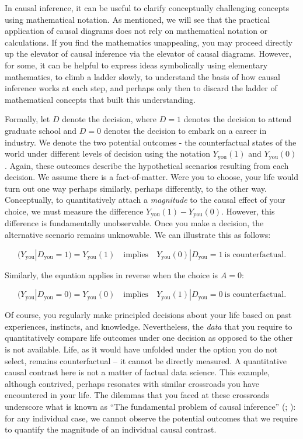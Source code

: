 \documentclass[
  singlecolumn]{article}
\begin{document}
In causal inference, it can be useful to clarify conceptually
challenging concepts using mathematical notation. As mentioned, we will
see that the practical application of causal diagrams does not rely on
mathematical notation or calculations. If you find the mathematics
unappealing, you may proceed directly up the elevator of causal
inference via the elevator of causal diagrams. However, for some, it can
be helpful to express ideas symbolically using elementary mathematics,
to climb a ladder slowly, to understand the basis of how causal
inference works at each step, and perhaps only then to discard the
ladder of mathematical concepts that built this understanding.

Formally, let \(D\) denote the decision, where \(D = 1\) denotes the
decision to attend graduate school and \(D=0\) denotes the decision to
embark on a career in industry. We denote the two potential outcomes -
the counterfactual states of the world under different levels of
decision using the notation \(Y_{\text{you}}(1)\) and
\(Y_{\text{you}}(0)\). Again, these outcomes describe the hypothetical
scenarios resulting from each decision. We assume there is a
fact-of-matter. Were you to choose, your life would turn out one way
perhaps similarly, perhaps differently, to the other way. Conceptually,
to quantitatively attach a \emph{magnitude} to the causal effect of your
choice, we must measure the difference
\(Y_{\text{you}}(1) - Y_{\text{you}}(0)\). However, this difference is
fundamentally unobservable. Once you make a decision, the alternative
scenario remains unknowable. We can illustrate this as follows:

\[
(Y_{\text{you}}|D_{\text{you}} = 1) = Y_{\text{you}}(1) \quad \text{implies} \quad Y_{\text{you}}(0)|D_{\text{you}} = 1~ \text{is counterfactual}.
\]

Similarly, the equation applies in reverse when the choice is \(A = 0\):

\[
(Y_{\text{you}}|D_{\text{you}} = 0) = Y_{\text{you}}(0) \quad \text{implies} \quad Y_{\text{you}}(1)|D_{\text{you}} = 0~ \text{is counterfactual}.
\]

Of course, you regularly make principled decisions about your life based
on past experiences, instincts, and knowledge. Nevertheless, the
\emph{data} that you require to quantitatively compare life outcomes
under one decision as opposed to the other is not available. Life, as it
would have unfolded under the option you do not select, remains
counterfactual -- it cannot be directly measured. A quantitative causal
contrast here is not a matter of factual data science. This example,
although contrived, perhaps resonates with similar crossroads you have
encountered in your life. The dilemmas that you faced at these
crossroads underscore what is known as ``The fundamental problem of
causal inference'' (;
): for any individual case, we
cannot observe the potential outcomes that we require to quantify the
magnitude of an individual causal contrast.
\end{document}
